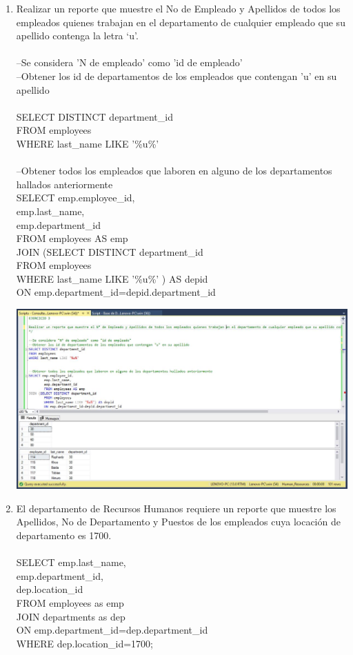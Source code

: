\begin{enumerate}[1.]
	\item Realizar un reporte que muestre el No de Empleado y Apellidos de todos los empleados quienes trabajan en el departamento de cualquier empleado que su apellido contenga la letra ‘u’.
	\\
	\\--Se considera 'N de empleado' como 'id de empleado'
	\\--Obtener los id de departamentos de los empleados que contengan 'u' en su apellido
	\\
	\\SELECT DISTINCT department\_id
	\\FROM employees
	\\WHERE last\_name LIKE '\%u\%'
	\\
	\\--Obtener todos los empleados que laboren en alguno de los departamentos hallados anteriormente
	\\SELECT emp.employee\_id,
	\\		emp.last\_name,
	\\		emp.department\_id
	\\		FROM employees AS emp
	\\JOIN (SELECT DISTINCT department\_id
	\\		FROM employees
	\\		WHERE last\_name LIKE '\%u\%' ) AS depid
	\\		ON emp.department\_id=depid.department\_id\\

	\begin{center}
	\includegraphics[width=17cm]{./Imagenes/Actividad9-Ejercicio03} 
	\end{center}

	\item El departamento de Recursos Humanos requiere un reporte que muestre los Apellidos, No de Departamento y Puestos de los empleados cuya locación de departamento es 1700.
	\\
	\\SELECT emp.last\_name,
	\\		emp.department\_id,
	\\		dep.location\_id
	\\		FROM employees as emp
	\\JOIN departments as dep
	\\	ON emp.department\_id=dep.department\_id
	\\	WHERE dep.location\_id=1700;\\


\end{enumerate}
